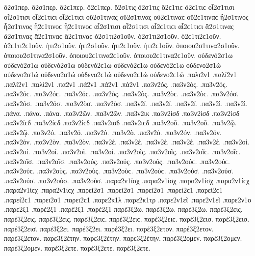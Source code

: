 {ὅ2σ1περ. ὅ2σ1περ. ὅ2ϲ1περ. ὅ2ϲ1περ.   %
ὅ2σ1τις ὅ2σ1τις ὅ2ϲ1τιϲ ὅ2ϲ1τιϲ   %
οἷ2σ1τισι οἷ2σ1τισι οἷ2ϲ1τιϲι οἷ2ϲ1τιϲι   %
οὕ2σ1τινας οὕ2σ1τινας οὕ2ϲ1τιναϲ οὕ2ϲ1τιναϲ   %
ἧ2σ1τινος ἧ2σ1τινος ἧ2ϲ1τινοϲ ἧ2ϲ1τινοϲ   %
αἷ2σ1τισι αἷ2σ1τισι αἷ2ϲ1τιϲι αἷ2ϲ1τιϲι   %
ἅ2σ1τινας ἅ2σ1τινας ἅ2ϲ1τιναϲ ἅ2ϲ1τιναϲ   %
ὁ2σ1τι2σ1οῦν. ὁ2σ1τι2σ1οῦν. ὁ2ϲ1τι2ϲ1οῦν. ὁ2ϲ1τι2ϲ1οῦν.   %
ἡτι2σ1οῦν. ἡτι2σ1οῦν. ἡτι2ϲ1οῦν. ἡτι2ϲ1οῦν.   %
ὁποιου2σ1τινα2σ1οῦν. ὁποιου2σ1τινα2σ1οῦν. ὁποιου2ϲ1τινα2ϲ1οῦν. ὁποιου2ϲ1τινα2ϲ1οῦν.   %
οὐδενό2σ1ω οὐδενό2σ1ω οὐδενό2σ1ω οὐδενό2ϲ1ω οὐδενό2ϲ1ω οὐδενό2ϲ1ω   %
οὐδενο2σ1ώ οὐδενο2σ1ώ οὐδενο2σ1ώ οὐδενο2ϲ1ώ οὐδενο2ϲ1ώ οὐδενο2ϲ1ώ 
.παλι2ν1   %
.παλί2ν1 .παλί2ν1 .παλί2ν1   %
.πα2ν1 
.πά2ν1 .πά2ν1 .πά2ν1 
.πα3ν2ός. .πα3ν2ός. .πα3ν2ός. .πα3ν2όϲ. .πα3ν2όϲ. .πα3ν2όϲ.   %
.πα3ν2ὸς. .πα3ν2ὸς. .πα3ν2ὸϲ. .πα3ν2ὸϲ. 
.πα3ν2όσ. .πα3ν2όσ. .πα3ν2όσ. 
.πα3ν2ὸσ. .πα3ν2ὸσ. 
.πα3ν2ί. .πα3ν2ί. .πα3ν2ί. 
.πα3ν2ὶ. .πα3ν2ὶ. 
.πάνα. .πάνα. .πάνα. 
.πα3ν2ῶν. .πα3ν2ῶν. 
.πα3ν2ικ   %
.πα3ν2ίσδ .πα3ν2ίσδ .πα3ν2ίσδ .πα3ν2ίϲδ .πα3ν2ίϲδ .πα3ν2ίϲδ   %
.πα3ν2ισδ .πα3ν2ιϲδ   %
.πα3ν2οῦ. .πα3ν2οῦ.   %
.πα3ν2ῷ. .πα3ν2ῷ. 
.πα3ν2ό. .πα3ν2ό. .πα3ν2ό. 
.πα3ν2ὸ. .πα3ν2ὸ. 
.πα3ν2όν. .πα3ν2όν. .πα3ν2όν. 
.πα3ν2ὸν. .πα3ν2ὸν. 
.πα3ν2έ. .πα3ν2έ. .πα3ν2έ. 
.πα3ν2ὲ. .πα3ν2ὲ. 
.πα3ν2οί. .πα3ν2οί. .πα3ν2οί. 
.πα3ν2οὶ. .πα3ν2οὶ. 
.πα3ν2οῖς. .πα3ν2οῖς. .πα3ν2οῖϲ. .πα3ν2οῖϲ. 
.πα3ν2οῖσ. .πα3ν2οῖσ. 
.πα3ν2ούς. .πα3ν2ούς. .πα3ν2ούς. .πα3ν2ούϲ. .πα3ν2ούϲ. .πα3ν2ούϲ. 
.πα3ν2οὺς. .πα3ν2οὺς. .πα3ν2οὺϲ. .πα3ν2οὺϲ. 
.πα3ν2ούσ. .πα3ν2ούσ. .πα3ν2ούσ. 
.πα3ν2οὺσ. .πα3ν2οὺσ. 
.παρα2ν1ίσχ .παρα2ν1ίσχ .παρα2ν1ίσχ .παρα2ν1ίϲχ .παρα2ν1ίϲχ .παρα2ν1ίϲχ   %
.παρεί2σ1 .παρεί2σ1 .παρεί2σ1 .παρεί2ϲ1 .παρεί2ϲ1 .παρεί2ϲ1   %
.παρει2σ1 .παρει2ϲ1 
.παρε2κ1λ   %
.παρε2κ1τρ   %
.παρε2ν1εῖ .παρε2ν1εῖ   %
.παρε2ν1ο   %
.παρε2ξ1 
.παρέ2ξ1 .παρέ2ξ1 .παρέ2ξ1 
παρέ3ξ2ω. παρέ3ξ2ω. παρέ3ξ2ω.   %
παρέ3ξ2εις. παρέ3ξ2εις. παρέ3ξ2εις. παρέ3ξ2ειϲ. παρέ3ξ2ειϲ. παρέ3ξ2ειϲ. 
παρέ3ξ2εισ. παρέ3ξ2εισ. παρέ3ξ2εισ. 
παρέ3ξ2ει. παρέ3ξ2ει. παρέ3ξ2ει. 
παρέ3ξ2ετον. παρέ3ξ2ετον. παρέ3ξ2ετον. 
παρε3ξ2έτην. παρε3ξ2έτην. παρε3ξ2έτην. 
παρέ3ξ2ομεν. παρέ3ξ2ομεν. παρέ3ξ2ομεν. 
παρέ3ξ2ετε. παρέ3ξ2ετε. παρέ3ξ2ετε. 
}
